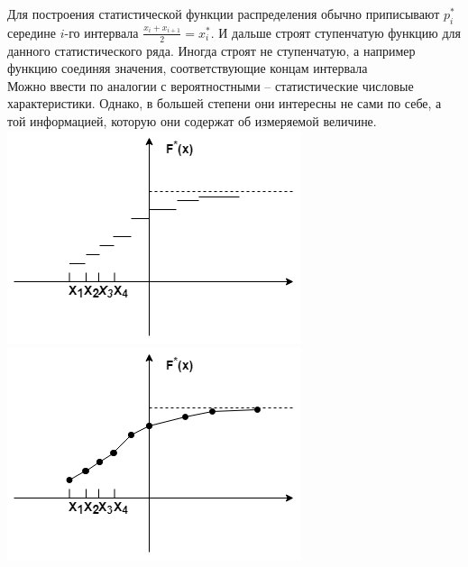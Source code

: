 \documentclass[russian, 12pt, fleqn]{article}
\begin{document}
Для построения статистической функции распределения обычно приписывают $p_i^*$ середине $i$-го интервала $\frac{x_i + x_{i + 1}}{2} = x_i^*$. И дальше строят ступенчатую функцию для данного статистического ряда. Иногда строят не ступенчатую, а например функцию соединяя значения, соответствующие концам интервала\\
Можно ввести по аналогии с вероятностными -- статистические числовые характеристики. Однако, в большей степени они интересны не сами по себе, а той информацией, которую они содержат об измеряемой величине.
\includegraphics[scale=0.6]{pg47_2.png}\\
\includegraphics[scale=0.6]{pg47_3.png}\\
\end{document}
